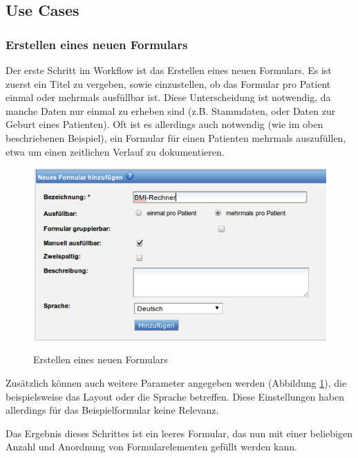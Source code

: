 \subsection{Use Cases}

\subsubsection{Erstellen eines neuen Formulars}

Der erste Schritt im Workflow ist das Erstellen eines neuen Formulars. Es ist zuerst ein Titel zu vergeben, sowie einzustellen, ob das Formular pro Patient einmal oder mehrmals ausfüllbar ist. Diese Unterscheidung ist not\-wen\-dig, da manche Daten nur einmal zu erheben sind (z.B. Stammdaten, oder Daten zur Geburt eines Patienten). Oft ist es allerdings auch not\-wen\-dig (wie im oben beschriebenen Beispiel), ein Formular für einen Patienten mehrmals auszufüllen, etwa um einen zeitlichen Verlauf zu dokumentieren.
 
\begin{figure}[h]
\begin{center}
\includegraphics[scale=0.5]{figures/workflow_neues_formular}
\caption{Erstellen eines neuen Formulars}

\label{abb_workflow_neues_formular}
\end{center}
\end{figure}

Zu\-sätz\-lich können auch weitere Parameter angegeben werden (Abbildung \ref{abb_workflow_neues_formular}), die beispielsweise das Layout oder die Sprache betreffen. Diese Einstellungen haben allerdings für das Beispielformular keine Relevanz.

Das Ergebnis dieses Schrittes ist ein leeres Formular, das nun mit einer beliebigen Anzahl und Anordnung von Formularelementen gefüllt werden kann.

